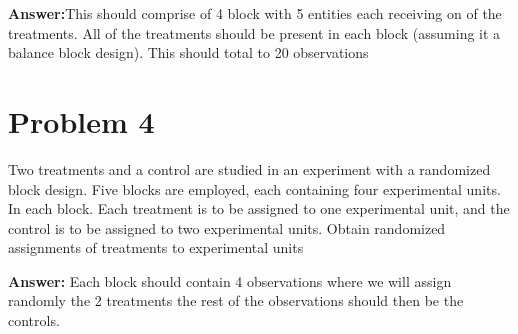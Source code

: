 \documentclass{article}
\begin{document}
\textbf{Answer:}This should comprise of 4 block with 5 entities each receiving on of the treatments. All of the treatments
should be present in each block (assuming it a balance block design). This should total to 20 observations

\section{Problem 4}
Two treatments and a control are studied in an experiment with a randomized block design. Five
blocks are employed, each containing four experimental units. In each block. Each treatment is to
be assigned to one experimental unit, and the control is to be assigned to two experimental units.
Obtain randomized assignments of treatments to experimental units

\textbf{Answer:} Each block should contain 4 observations where we will assign randomly the 2 treatments
the rest of the observations should then be the controls.
\end{document}
